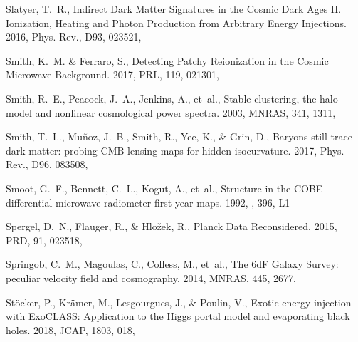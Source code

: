 \documentclass[longauth,traditabstract]{aa}
\def\mnras{{MNRAS}}
\def\prd{{PRD}}
\def\prl{{PRL}}
\begin{document}
\begin{thebibliography}{379}
Slatyer, T.~R., {Indirect Dark Matter Signatures in the Cosmic Dark Ages II.
  Ionization, Heating and Photon Production from Arbitrary Energy Injections}.
  2016{}, Phys. Rev., D93, 023521, 

Smith, K.~M. \& Ferraro, S., {Detecting Patchy Reionization in the Cosmic
  Microwave Background}. 2017, \prl, 119, 021301, 

Smith, R.~E., Peacock, J.~A., Jenkins, A., {et~al.}, {Stable clustering, the
  halo model and nonlinear cosmological power spectra}. 2003, \mnras, 341,
  1311, 

Smith, T.~L., {Mu{\~n}oz}, J.~B., Smith, R., Yee, K., \& Grin, D., {Baryons
  still trace dark matter: probing CMB lensing maps for hidden isocurvature}.
  2017, Phys. Rev., D96, 083508, 

{Smoot}, G.~F., {Bennett}, C.~L., {Kogut}, A., {et~al.}, {Structure in the COBE
  differential microwave radiometer first-year maps}. 1992, \apjl, 396, L1

Spergel, D.~N., Flauger, R., \& Hložek, R., {Planck Data Reconsidered}. 2015,
  \prd, 91, 023518, 

{Springob}, C.~M., {Magoulas}, C., {Colless}, M., {et~al.}, {The 6dF Galaxy
  Survey: peculiar velocity field and cosmography}. 2014, \mnras, 445, 2677,

Stöcker, P., Krämer, M., Lesgourgues, J., \& Poulin, V., {Exotic energy
  injection with ExoCLASS: Application to the Higgs portal model and
  evaporating black holes}. 2018, JCAP, 1803, 018, 


\end{thebibliography}
\end{document}
